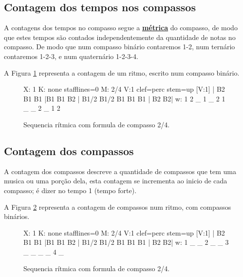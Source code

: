 \subsection{Contagem dos tempos nos compassos}
A contagens dos tempos no compasso segue a \hyperref[def:Metrica]{\textbf{métrica}}
do compasso, de modo que estes tempos são contados independentemente da quantidade de notas no compasso.
De modo que num compasso binário contaremos 1-2, num ternário contaremos 1-2-3, e
num quaternário 1-2-3-4.
\begin{example}
A Figura \ref{fig:contartempocomp1} representa a contagem de um ritmo,
escrito num compasso binário.
\end{example}
\begin{figure}[h]
    \centering
 \begin{abc}[name=abc-contartempocomp1,width=\linewidth]
%
X: 1 %
K: none stafflines=0 %
M:  2/4
V:1 clef=perc stem=up %
%
[V:1] | B2 B1 B1  |B1 B1 B2  | B1/2 B1/2 B1 B1 B1 | B2 B2|
w:      1  2  _    1  _  2     1  _ _    2  _       1  2
%       
\end{abc}
    \caption{Sequencia rítmica com formula de compasso 2/4.}\label{fig:contartempocomp1}
\end{figure}


\subsection{Contagem dos compassos}
A contagem dos compassos descreve a quantidade de compassos que tem uma musica ou uma porção dela,
esta contagem se incrementa ao inicio de cada compasso; é dizer no tempo 1 (tempo forte).
\begin{example}
A Figura \ref{fig:contarcompassos2} representa a contagem de compassos num ritmo,
com compassos binários. 
\end{example}
\begin{figure}[h]
    \centering
 \begin{abc}[name=abc-contarcompassos2,width=\linewidth]
%
X: 1 %
K: none stafflines=0 %
M:  2/4
V:1 clef=perc stem=up %
%
[V:1] | B2 B1 B1  |B1 B1 B2  | B1/2 B1/2 B1 B1 B1 | B2 B2|
w:      1  _  _    2  _  _     3  _ _    _  _       4  _
%       
\end{abc}
    \caption{Sequencia rítmica com formula de compasso 2/4.}\label{fig:contarcompassos2}
\end{figure}

